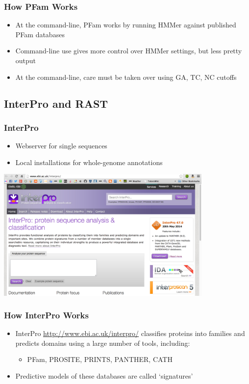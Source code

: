 \documentclass[table]{beamer}
\begin{document}
    \begin{frame}
      \frametitle{How PFam Works}   
      \begin{itemize}
        \item At the command-line, PFam works by running HMMer against published PFam databases
        \item Command-line use gives more control over HMMer settings, but less pretty output
        \item At the command-line, care must be taken over using GA, TC, NC cutoffs
      \end{itemize}
    \end{frame}

    \subsection{InterPro and RAST}
    \begin{frame}
      \frametitle{InterPro}   
      \begin{itemize}
        \item Webserver for single sequences
        \item Local installations for whole-genome annotations
      \end{itemize}
      \begin{center}
        \includegraphics[width=0.8\textwidth]{images/interpro} 
      \end{center}        
    \end{frame}
    
    \begin{frame}
      \frametitle{How InterPro Works}   
      \begin{itemize}
        \item InterPro \url{http://www.ebi.ac.uk/interpro/} classifies proteins into families and predicts domains using a large number of tools, including:
        \begin{itemize}
          \item PFam, PROSITE, PRINTS, PANTHER, CATH
        \end{itemize}
        \item Predictive models of these databases are called `signatures'
      \end{itemize}
    \end{frame}
\end{document}
